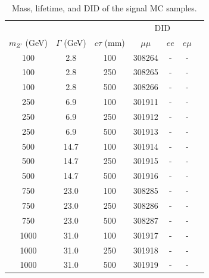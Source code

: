 \begin{table}[!htb]
  \centering
  \begin{tabular}{ c c c c c c c }
    \hline
    \hline
           &   &    & \multicolumn{3}{c}{DID}                 \\
    $m_{Z'}$ (GeV) & $\Gamma$ (GeV) & $c\tau$ (mm) &$\mu\mu$ & $ee$ & $e\mu$ \\
    \hline
    100			   &	2.8         &   100	& 308264	& -		&	-		\\
    100			   &	2.8         &   250	& 308265	& -		&	-		\\
    100			   &	2.8         &   500	& 308266	& -		&	-		\\
    250			   &   6.9	        &   100	& 301911	& -		&	-		\\
    250			   &	6.9         &   250	& 301912	& -		&	-		\\
    250			   &	6.9         &   500	& 301913	& -		&	-		\\
    500			   &   14.7         &   100	& 301914	& -		&	-		\\
    500			   &	14.7        &   250	& 301915	& -		&	-		\\
    500			   &	14.7        &   500	& 301916	& -		&	-		\\
    750			   &	23.0        &   100	& 308285	& -		&	-		\\
    750			   &	23.0        &   250	& 308286	& -		&	-		\\
    750			   &	23.0        &   500	& 308287	& -		&	-		\\
    1000	       &	31.0        &   100	& 301917	& -		&	-		\\
    1000	       &	31.0        &   250	& 301918	& -		&	-		\\
    1000	       &	31.0        &   500	& 301919	& -		&	-		\\
    \hline
    \hline
  \end{tabular}
  \caption{Mass, lifetime, and DID of the signal MC samples.}
  \label{table:MC_signal_samples}
\end{table}
